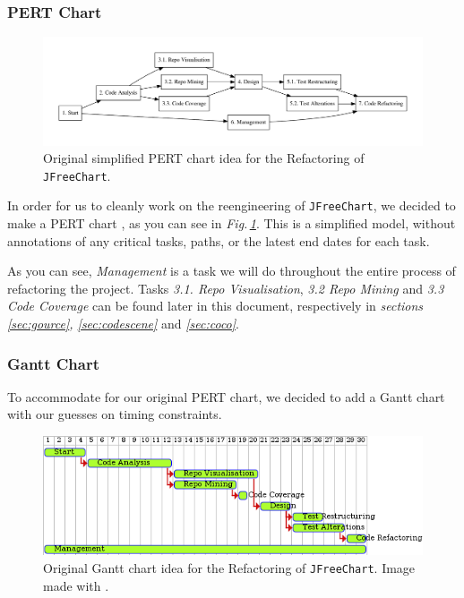 \documentclass[11pt]{article}
\begin{document}
	\subsubsection{PERT Chart} 
	\begin{figure}[H] 
		\centering 
		\includegraphics[width=\textwidth]{pictures/pert-original.pdf}
		\caption{Original simplified \textsf{PERT} chart idea for the Refactoring of \texttt{JFreeChart}.} 
		\label{fig:pert-orig} 
	\end{figure} 
   
	In order for us to cleanly work on the reengineering of \texttt{JFreeChart}, we decided to make a \textsf{PERT} chart \cite{pert}, as you can see in \textsl{Fig.\,\ref{fig:pert-orig}}. This is a simplified model, without annotations of any critical tasks, paths, or the latest end dates for each task. 
   
	As you can see, \textsl{Management} is a task we will do throughout the entire process of refactoring the project. Tasks \textsl{3.1. Repo Visualisation}, \textsl{3.2 Repo Mining} and \textsl{3.3 Code Coverage} can be found later in this document, respectively in \textsl{sections \ref{sec:gource}, \ref{sec:codescene}} and \textsl{\ref{sec:coco}}.
	
	\subsubsection{Gantt Chart}
	To accommodate for our original \textsf{PERT} chart, we decided to add a \textsf{Gantt} chart \cite{gantt} with our guesses on timing constraints.
	
	\begin{figure}[H] 
		\centering 
		\includegraphics[width=\textwidth]{pictures/gantt-original.png}
		\caption{Original \textsf{Gantt} chart idea for the Refactoring of \texttt{JFreeChart}. Image made with \cite{plantuml}.} 
		\label{fig:gantt-orig} 
	\end{figure} 
\end{document}
